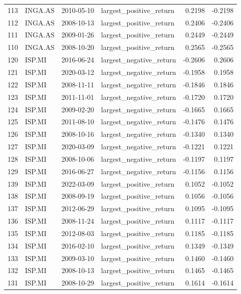 \begin{table}
\begin{tabular}{llllrr}
113 & INGA.AS & 2010-05-10 & largest_positive_return & 0.2198 & -0.2198 \\
112 & INGA.AS & 2008-10-13 & largest_positive_return & 0.2406 & -0.2406 \\
111 & INGA.AS & 2009-01-26 & largest_positive_return & 0.2449 & -0.2449 \\
110 & INGA.AS & 2008-10-20 & largest_positive_return & 0.2565 & -0.2565 \\
120 & ISP.MI & 2016-06-24 & largest_negative_return & -0.2606 & 0.2606 \\
121 & ISP.MI & 2020-03-12 & largest_negative_return & -0.1958 & 0.1958 \\
122 & ISP.MI & 2008-11-11 & largest_negative_return & -0.1846 & 0.1846 \\
123 & ISP.MI & 2011-11-01 & largest_negative_return & -0.1720 & 0.1720 \\
124 & ISP.MI & 2009-02-20 & largest_negative_return & -0.1665 & 0.1665 \\
125 & ISP.MI & 2011-08-10 & largest_negative_return & -0.1476 & 0.1476 \\
126 & ISP.MI & 2008-10-16 & largest_negative_return & -0.1340 & 0.1340 \\
127 & ISP.MI & 2020-03-09 & largest_negative_return & -0.1221 & 0.1221 \\
128 & ISP.MI & 2008-10-06 & largest_negative_return & -0.1197 & 0.1197 \\
129 & ISP.MI & 2016-06-27 & largest_negative_return & -0.1156 & 0.1156 \\
139 & ISP.MI & 2022-03-09 & largest_positive_return & 0.1052 & -0.1052 \\
138 & ISP.MI & 2008-09-19 & largest_positive_return & 0.1056 & -0.1056 \\
137 & ISP.MI & 2012-06-29 & largest_positive_return & 0.1095 & -0.1095 \\
136 & ISP.MI & 2008-11-24 & largest_positive_return & 0.1117 & -0.1117 \\
135 & ISP.MI & 2012-08-03 & largest_positive_return & 0.1185 & -0.1185 \\
134 & ISP.MI & 2016-02-10 & largest_positive_return & 0.1349 & -0.1349 \\
133 & ISP.MI & 2009-03-10 & largest_positive_return & 0.1460 & -0.1460 \\
132 & ISP.MI & 2008-10-13 & largest_positive_return & 0.1465 & -0.1465 \\
131 & ISP.MI & 2008-10-29 & largest_positive_return & 0.1614 & -0.1614 \\

\end{tabular}
\end{table}
